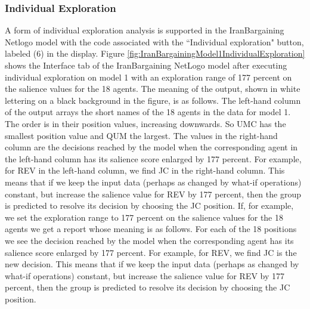 \subsubsection{Individual Exploration}

A form of individual exploration analysis is supported in the IranBargaining Netlogo model with the code associated with the ``Individual exploration" button, labeled (6) in the display. 
Figure \ref{fig:IranBargainingModel1IndividualExploration} shows the Interface tab of the IranBargaining NetLogo model after executing individual exploration on model 1 with an exploration range of 177 percent on the salience values for the 18 agents. The meaning of the output, shown in white lettering on a black background in the figure, is as follows. The left-hand column of the output arrays the short names of the 18 agents in the data for model 1. The order is in their position values, increasing downwards. So UMC has the smallest position value and QUM the largest. The values in the right-hand column are the decisions reached by the model when the corresponding agent in the left-hand column has its salience score enlarged by 177 percent. For example, for REV in the left-hand column, we find JC in the right-hand column. This means that if we keep the input data (perhaps as changed by what-if operations) constant, but increase the salience value for REV by 177 percent, then the group is predicted to resolve its decision by choosing the JC position.
If, for example, we set the exploration range to 177 percent on the salience values for the 18 agents we get a report whose meaning is as follows. For each of the 18 positions we see  the decision reached by the model when the corresponding agent  has its salience score enlarged by 177 percent. For example, for REV, we find JC is the new decision. This means that if we keep the input data (perhaps as changed by what-if operations) constant, but increase the salience value for REV by 177 percent, then the group is predicted to resolve its decision by choosing the JC position.

